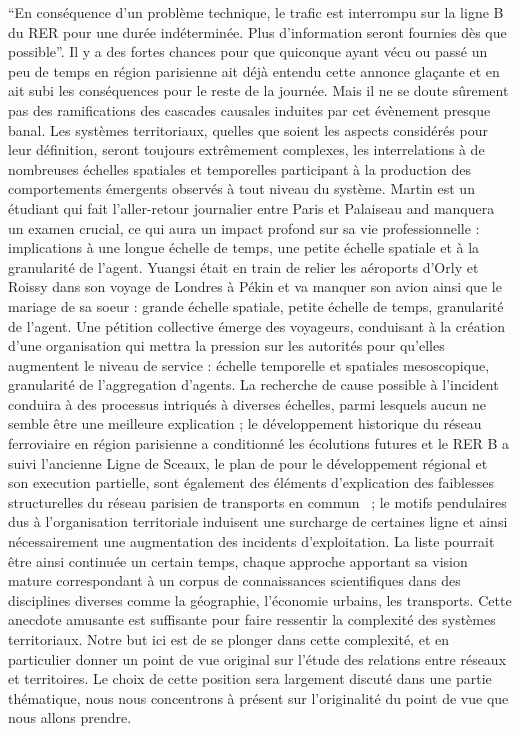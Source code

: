 {}{
``En conséquence d'un problème technique, le trafic est interrompu sur la ligne B du RER pour une durée indéterminée. Plus d'information seront fournies dès que possible''. Il y a des fortes chances pour que quiconque ayant vécu ou passé un peu de temps en région parisienne ait déjà entendu cette annonce glaçante et en ait subi les conséquences pour le reste de la journée. Mais il ne se doute sûrement pas des ramifications des cascades causales induites par cet évènement presque banal. Les systèmes territoriaux, quelles que soient les aspects considérés pour leur définition, seront toujours extrêmement complexes, les interrelations à de nombreuses échelles spatiales et temporelles participant à la production des comportements émergents observés à tout niveau du système. Martin est un étudiant qui fait l'aller-retour journalier entre Paris et Palaiseau and manquera un examen crucial, ce qui aura un impact profond sur sa vie professionnelle : implications à une longue échelle de temps, une petite échelle spatiale et à la granularité de l'agent. Yuangsi était en train de relier les aéroports d'Orly et Roissy dans son voyage de Londres à Pékin et va manquer son avion ainsi que le mariage de sa soeur : grande échelle spatiale, petite échelle de temps, granularité de l'agent. Une pétition collective émerge des voyageurs, conduisant à la création d'une organisation qui mettra la pression sur les autorités pour qu'elles augmentent le niveau de service : échelle temporelle et spatiales mesoscopique, granularité de l'aggregation d'agents. La recherche de cause possible à l'incident conduira à des processus intriqués à diverses échelles, parmi lesquels aucun ne semble être une meilleure explication ; le développement historique du réseau ferroviaire en région parisienne a conditionné les écolutions futures et le RER B a suivi l'ancienne Ligne de Sceaux, le plan de  pour le développement régional et son execution partielle, sont également des éléments d'explication des faiblesses structurelles du réseau parisien de transports en commun~\cite{gleyze2005vulnerabilite} ; le motifs pendulaires dus à l'organisation territoriale induisent une surcharge de certaines ligne et ainsi nécessairement une augmentation des incidents d'exploitation. La liste pourrait être ainsi continuée un certain temps, chaque approche apportant sa vision mature correspondant à un corpus de connaissances scientifiques dans des disciplines diverses comme la géographie, l'économie urbains, les transports. Cette anecdote amusante est suffisante pour faire ressentir la complexité des systèmes territoriaux. Notre but ici est de se plonger dans cette complexité, et en particulier donner un point de vue original sur l'étude des relations entre réseaux et territoires. Le choix de cette position sera largement discuté dans une partie thématique, nous nous concentrons à présent sur l'originalité du point de vue que nous allons prendre.
}





